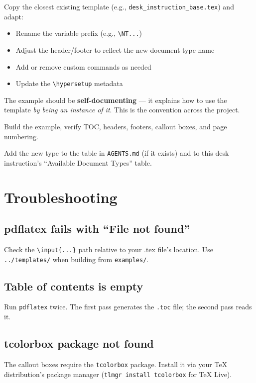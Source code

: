 {\begin{enumerate}
Copy the closest existing template (e.g., \texttt{desk\_instruction\_base.tex}) and adapt:
\begin{itemize}
\item Rename the variable prefix (e.g., \texttt{\textbackslash{}NT...})
\item Adjust the header/footer to reflect the new document type name
\item Add or remove custom commands as needed
\item Update the \texttt{\textbackslash{}hypersetup} metadata
\end{itemize}

The example should be \textbf{self-documenting} --- it explains how to use the template \textit{by being an instance of it}. This is the convention across the project.


Build the example, verify TOC, headers, footers, callout boxes, and page numbering.

Add the new type to the table in \texttt{AGENTS.md} (if it exists) and to this desk instruction's ``Available Document Types'' table.
\end{enumerate}

\section{Troubleshooting}

\subsection{pdflatex fails with ``File not found''}
Check the \texttt{\textbackslash{}input\{...\}} path relative to your .tex file's location. Use \texttt{../templates/} when building from \texttt{examples/}.

\subsection{Table of contents is empty}
Run \texttt{pdflatex} twice. The first pass generates the \texttt{.toc} file; the second pass reads it.

\subsection{tcolorbox package not found}
The callout boxes require the \texttt{tcolorbox} package. Install it via your TeX distribution's package manager (\texttt{tlmgr install tcolorbox} for TeX Live).

}
